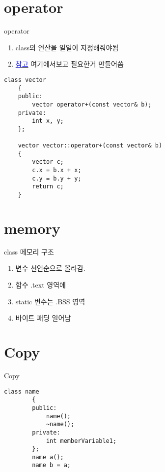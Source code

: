 \documentclass[10pt]{beamer}
\begin{document}
\section{operator}


\begin{frame}[fragile]{operator}
    \begin{enumerate}
        \item class의 연산을 일일이 지정해줘야됨
        \item \href{https://en.wikipedia.org/wiki/Operators_in_C_and_C%2B%2B}{\textcolor{blue}{참고}}
        여기에서보고 필요한거 만들어씀
        

    \end{enumerate}


    \begin{lstlisting}[style = CStyle]
    class vector
    {
    public:
        vector operator+(const vector& b);
    private:
        int x, y;
    };

    vector vector::operator+(const vector& b)
    {
        vector c;
        c.x = b.x + x;
        c.y = b.y + y;
        return c;
    }
    \end{lstlisting}
    
\end{frame}    


\section{memory}

\begin{frame}{class 메모리 구조}
    \begin{enumerate}
        \item 변수 선언순으로 올라감.
        \item 함수 .text 영역에
        \item static 변수는 .BSS 영역
        \item 바이트 패딩 일어남
    \end{enumerate}
\end{frame}    


\section{Copy}

\begin{frame}[fragile]{Copy}
    \begin{lstlisting}[style = CStyle]
        class name
        {
        public:
            name();
            ~name();
        private:
            int memberVariable1;
        };
        name a();
        name b = a; 
        \end{lstlisting}
\end{frame}    
\end{document}
